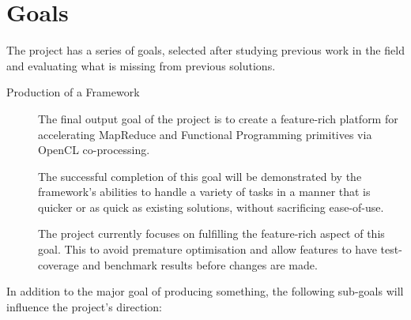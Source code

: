 \section{Goals}

The project has a series of goals, selected after studying previous work in the field and evaluating what is missing from previous solutions.

\begin{description}
  \item[Production of a Framework]
  The final output goal of the project is to create a feature-rich platform for accelerating MapReduce and Functional Programming primitives via OpenCL co-processing.

  The successful completion of this goal will be demonstrated by the framework's abilities to handle a variety of tasks in a manner that is quicker or as quick as existing solutions, without sacrificing ease-of-use.

  The project currently focuses on fulfilling the feature-rich aspect of this goal. This to avoid premature optimisation and allow features to have test-coverage and benchmark results before changes are made.
\end{description}

In addition to the major goal of producing something, the following sub-goals will influence the project's direction:

